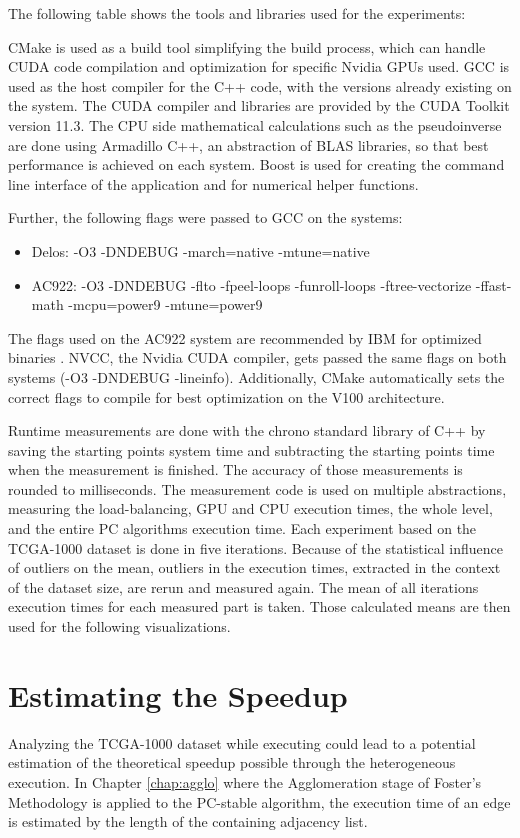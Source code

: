 The following table shows the tools and libraries used for the experiments:


CMake is used as a build tool simplifying the build process, which can handle CUDA code compilation and optimization for specific Nvidia GPUs used. GCC is used as the host compiler for the C++ code, with the versions already existing on the system. The CUDA compiler and libraries are provided by the CUDA Toolkit version 11.3. The CPU side mathematical calculations such as the pseudoinverse are done using Armadillo C++, an abstraction of BLAS libraries, so that best performance is achieved on each system. Boost is used for creating the command line interface of the application and for numerical helper functions.

Further, the following flags were passed to GCC on the systems:
\begin{itemize}
  \item Delos: -O3 -DNDEBUG -march=native -mtune=native
  \item AC922: -O3 -DNDEBUG -flto -fpeel-loops -funroll-loops -ftree-vectorize -ffast-math -mcpu=power9 -mtune=power9
\end{itemize}
The flags used on the AC922 system are recommended by IBM for optimized binaries \cite{LinuxIBMPower}. NVCC, the Nvidia CUDA compiler, gets passed the same flags on both systems (-O3 -DNDEBUG -lineinfo). Additionally, CMake automatically sets the correct flags to compile for best optimization on the V100 architecture.

Runtime measurements are done with the chrono standard library of C++ by saving the starting points system time and subtracting the starting points time when the measurement is finished. The accuracy of those measurements is rounded to milliseconds. The measurement code is used on multiple abstractions, measuring the load-balancing, GPU and CPU execution times, the whole level, and the entire PC algorithms execution time.
Each experiment based on the TCGA-1000 dataset is done in five iterations.  Because of the statistical influence of outliers on the mean, outliers in the execution times, extracted in the context of the dataset size, are rerun and measured again. The mean of all iterations execution times for each measured part is taken. Those calculated means are then used for the following visualizations.

\section{Estimating the Speedup}
\label{chap:est_speedup}
Analyzing the TCGA-1000 dataset while executing could lead to a potential estimation of the theoretical speedup possible through the heterogeneous execution. In Chapter \ref{chap:agglo} where the Agglomeration stage of Foster's Methodology is applied to the PC-stable algorithm, the execution time of an edge is estimated by the length of the containing adjacency list.


